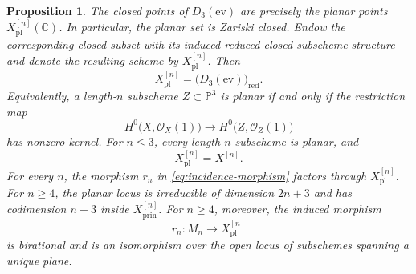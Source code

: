 \documentclass[12pt]{amsart}
\numberwithin{equation}{section}
\newcommand{\PP}{\mathbb{P}}
\newcommand{\C}{\mathbb{C}}
\newcommand{\OO}{\mathcal{O}}
\theoremstyle{plain}
\newtheorem{proposition}[theorem]{Proposition}
\theoremstyle{definition}
\theoremstyle{remark}
\begin{document}
\begin{proposition}\label{prop:planar-locus-degeneracy}
The closed points of $D_3(\mathrm{ev})$ are precisely the planar points $X^{[n]}_{\mathrm{pl}}(\C)$.
In particular, the planar set is Zariski closed.
Endow the corresponding closed subset with its induced reduced closed-subscheme structure and denote the resulting scheme by $X^{[n]}_{\mathrm{pl}}$.
Then
\begin{equation}\label{eq:planar-locus-reduced-degeneracy}
X^{[n]}_{\mathrm{pl}}=\bigl(D_3(\mathrm{ev})\bigr)_{\mathrm{red}}.
\end{equation}
Equivalently, a length-$n$ subscheme $Z\subset \PP^3$ is planar if and only if the restriction map
\[
H^0\bigl(X,\OO_X(1)\bigr)\longrightarrow H^0\bigl(Z,\OO_Z(1)\bigr)
\]
has nonzero kernel.
For $n\leq 3$, every length-$n$ subscheme is planar, and
\[
X^{[n]}_{\mathrm{pl}}=X^{[n]}.
\]
For every $n$, the morphism $r_n$ in \eqref{eq:incidence-morphism} factors through $X^{[n]}_{\mathrm{pl}}$.
For $n\geq 4$, the planar locus is irreducible of dimension $2n+3$ and has codimension $n-3$ inside $X^{[n]}_{\mathrm{prin}}$.
For $n\geq 4$, moreover, the induced morphism
\[
r_n\colon M_n\longrightarrow X^{[n]}_{\mathrm{pl}}
\]
is birational and is an isomorphism over the open locus of subschemes spanning a unique plane.
\end{proposition}
\end{document}
